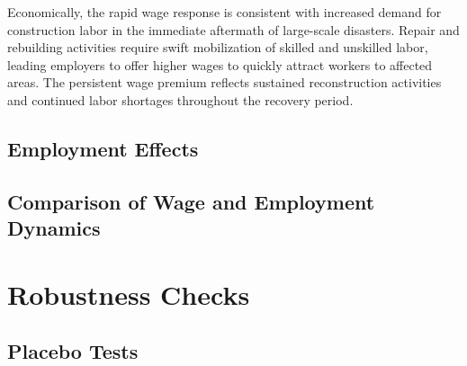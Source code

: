 \documentclass{article}
\begin{document}
Economically, the rapid wage response is consistent with increased demand for construction labor in the immediate aftermath of large-scale disasters. Repair and rebuilding activities require swift mobilization of skilled and unskilled labor, leading employers to offer higher wages to quickly attract workers to affected areas. The persistent wage premium reflects sustained reconstruction activities and continued labor shortages throughout the recovery period.

\subsection{Employment Effects}




\subsection{Comparison of Wage and Employment Dynamics}


\section{Robustness Checks}

\subsection{Placebo Tests}

\end{document}
